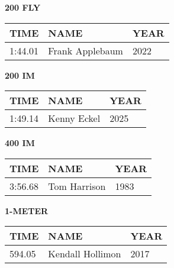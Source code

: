 \begin{minipage}[t]{0.48\textwidth}
\centering
\textbf{200 FLY}\\[0.05cm]
\begin{tabular}{@{}p{1.8cm}p{2.8cm}p{1.2cm}@{}}
\hline
\textbf{TIME} & \textbf{NAME} & \textbf{YEAR} \\
\hline
1:44.01 & Frank Applebaum & 2022 \\
\hline
\end{tabular}
\end{minipage}\hfill
\begin{minipage}[t]{0.48\textwidth}
\centering
\textbf{200 IM}\\[0.05cm]
\begin{tabular}{@{}p{1.8cm}p{2.8cm}p{1.2cm}@{}}
\hline
\textbf{TIME} & \textbf{NAME} & \textbf{YEAR} \\
\hline
1:49.14 & Kenny Eckel & 2025 \\
\hline
\end{tabular}
\end{minipage}

\vspace{0.4cm}

\begin{center}
\begin{minipage}[t]{0.7\textwidth}
\centering
\textbf{400 IM}\\[0.05cm]
\begin{tabular}{@{}p{1.8cm}p{2.8cm}p{1.2cm}@{}}
\hline
\textbf{TIME} & \textbf{NAME} & \textbf{YEAR} \\
\hline
3:56.68 & Tom Harrison & 1983 \\
\hline
\end{tabular}
\end{minipage}
\end{center}

\vspace{0.4cm}

\begin{center}
\begin{minipage}[t]{0.7\textwidth}
\centering
\textbf{1-METER}\\[0.05cm]
\begin{tabular}{@{}p{1.8cm}p{2.8cm}p{1.2cm}@{}}
\hline
\textbf{TIME} & \textbf{NAME} & \textbf{YEAR} \\
\hline
594.05 & Kendall Hollimon & 2017 \\
\hline
\end{tabular}
\end{minipage}
\end{center}

